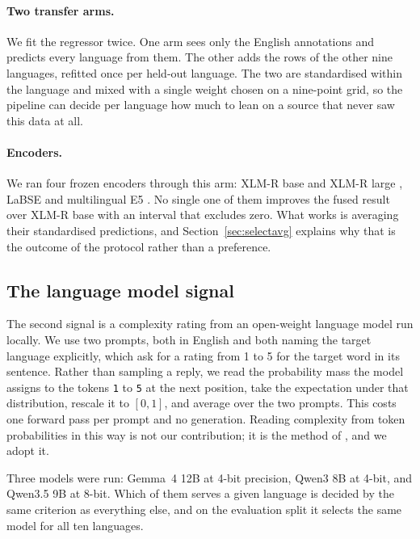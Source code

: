 \paragraph{Two transfer arms.} We fit the regressor twice. One arm sees
only the English annotations and predicts every language from them. The
other adds the rows of the other nine languages, refitted once per
held-out language. The two are standardised within the language and
mixed with a single weight chosen on a nine-point grid, so the pipeline
can decide per language how much to lean on a source that never saw this
data at all.

\paragraph{Encoders.} We ran four frozen encoders through this
arm: XLM-R base and XLM-R large \citep{conneau2020xlmr}, LaBSE
\citep{feng-etal-2022-language} and multilingual E5
\citep{wang2024multilinguale5}. No single one of them improves the
fused result over XLM-R base with an interval that excludes zero. What
works is averaging their standardised predictions, and
Section~\ref{sec:selectavg} explains why that is the outcome of the
protocol rather than a preference.

\subsection{The language model signal}
\label{sec:signalB}

The second signal is a complexity rating from an open-weight language
model run locally. We use two prompts, both in English and both naming
the target language explicitly, which ask for a rating from 1 to 5 for
the target word in its sentence. Rather than sampling a reply, we read
the probability mass the model assigns to the tokens \texttt{1} to
\texttt{5} at the next position, take the expectation under that
distribution, rescale it to $[0,1]$, and average over the two prompts.
This costs one forward pass per prompt and no generation. Reading
complexity from token probabilities in this way is not our contribution;
it is the method of \citet{nohejl-etal-2025-japanese}, and we adopt it.

Three models were run: Gemma~4 12B at 4-bit precision, Qwen3 8B at
4-bit, and Qwen3.5 9B at 8-bit. Which of them serves a given language is
decided by the same criterion as everything else, and on the evaluation
split it selects the same model for all ten languages.

